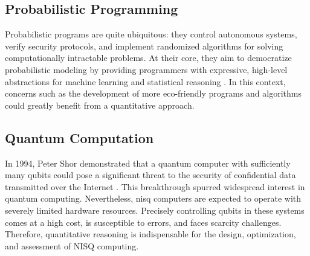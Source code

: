 \subsection*{Probabilistic Programming}

Probabilistic programs are quite  ubiquitous: they control autonomous systems, verify security protocols, and implement randomized algorithms for solving computationally intractable problems. At their core, they aim to democratize probabilistic modeling by providing programmers with expressive, high-level abstractions for machine learning and statistical reasoning \cite{bartheFoundationsProbabilisticProgramming2020}. In this context, concerns such as the development of more eco-friendly programs and algorithms could greatly benefit from a quantitative approach.







\subsection*{Quantum Computation}

In 1994, Peter Shor demonstrated that a quantum computer with sufficiently many qubits could pose a significant threat to the security of confidential data transmitted over the Internet \cite{shor1994algorithms}. This breakthrough spurred widespread interest in quantum computing. Nevertheless, \acrfull{nisq}  computers are expected to operate with severely limited hardware resources. Precisely controlling qubits in these systems comes at a high cost, is susceptible to errors, and faces scarcity challenges. Therefore, quantitative reasoning is indispensable for the design, optimization, and assessment of NISQ computing. 


